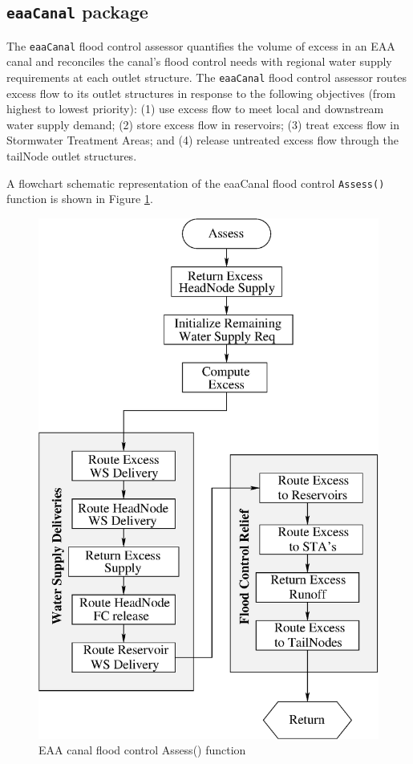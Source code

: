\subsection{{\tt eaaCanal} package} \label{fceaacanal}

The {\tt eaaCanal} flood control assessor quantifies the volume of
excess in an EAA canal and reconciles the canal's flood control needs
with regional water supply requirements at each outlet structure. The
{\tt eaaCanal} flood control assessor routes excess flow to its outlet
structures in response to the following objectives (from highest to
lowest priority): (1) use excess flow to meet local and downstream
water supply demand; (2) store excess flow in reservoirs; (3) treat
excess flow in Stormwater Treatment Areas; and (4) release untreated
excess flow through the tailNode outlet structures.

A flowchart schematic representation of the eaaCanal flood control
{\tt Assess()} function is shown in Figure \ref{fig:eaaCanalFC}. 

\begin{figure}[!htb]
 \begin{center}
  \includegraphics[scale=.5]{Graphics/eaaCanalFC}
  \caption{\label{fig:eaaCanalFC} EAA canal flood control Assess() function}
 \end{center}
\end{figure}

